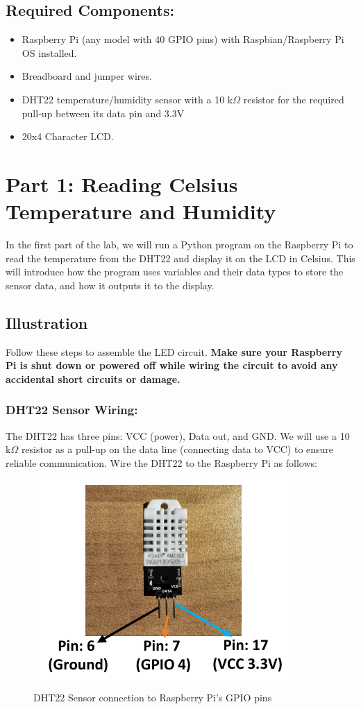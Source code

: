 \documentclass[a4paper,11pt]{article}
\begin{document}
\subsection*{Required Components:}
\begin{itemize}
    \item Raspberry Pi (any model with 40 GPIO pins) with Raspbian/Raspberry Pi OS installed. 
\item Breadboard and jumper wires.
\item DHT22 temperature/humidity sensor with a 10 k$\Omega$ resistor for the required pull-up between its data pin and 3.3V
\item 20x4 Character LCD.
\end{itemize}


\newpage
\section*{Part 1: Reading Celsius Temperature and Humidity}
In the first part of the lab, we will run a Python program on the Raspberry Pi to 
read the temperature from the DHT22 and display it on the LCD in Celsius. 
This will introduce how the program uses variables and their data types to 
store the sensor data, and how it outputs it to the display.


\subsection*{Illustration}

Follow these steps to assemble the LED circuit. \textbf{Make sure your Raspberry Pi 
is shut down or powered off while wiring the circuit to avoid any accidental 
short circuits or damage.}

\subsubsection*{DHT22 Sensor Wiring:}
The DHT22 has three pins: VCC (power), Data out, and GND. 
We will use a 10 k$\Omega$  resistor as a pull-up on the data line (connecting data to VCC) 
to ensure reliable communication. Wire the DHT22 to the Raspberry Pi as follows:

    \begin{figure}[h] %
        \centering
        \includegraphics[width=.65\textwidth]{fig1.pdf} %
        \caption{DHT22 Sensor connection to Raspberry Pi's GPIO pins}
        \label{fig:runtime}
    \end{figure}
\end{document}
